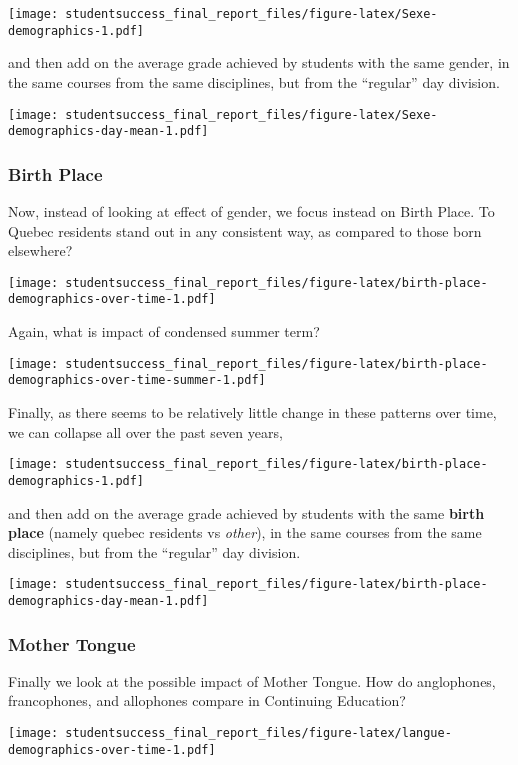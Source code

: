 \documentclass[]{book}
\theoremstyle{definition}
\theoremstyle{definition}
\theoremstyle{remark}
\begin{document}
\texttt{[image: studentsuccess\_final\_report\_files/figure-latex/Sexe-demographics-1.pdf]}

and then add on the average grade achieved by students with the same
gender, in the same courses from the same disciplines, but from the
``regular'' day division.

\texttt{[image: studentsuccess\_final\_report\_files/figure-latex/Sexe-demographics-day-mean-1.pdf]}

\subsubsection{Birth Place}\label{birth-place}

Now, instead of looking at effect of gender, we focus instead on Birth
Place. To Quebec residents stand out in any consistent way, as compared
to those born elsewhere?

\texttt{[image: studentsuccess\_final\_report\_files/figure-latex/birth-place-demographics-over-time-1.pdf]}

Again, what is impact of condensed summer term?

\texttt{[image: studentsuccess\_final\_report\_files/figure-latex/birth-place-demographics-over-time-summer-1.pdf]}

Finally, as there seems to be relatively little change in these patterns
over time, we can collapse all over the past seven years,

\texttt{[image: studentsuccess\_final\_report\_files/figure-latex/birth-place-demographics-1.pdf]}

and then add on the average grade achieved by students with the same
\textbf{birth place} (namely quebec residents vs \emph{other}), in the
same courses from the same disciplines, but from the ``regular'' day
division.

\texttt{[image: studentsuccess\_final\_report\_files/figure-latex/birth-place-demographics-day-mean-1.pdf]}

\subsubsection{Mother Tongue}\label{mother-tongue}

Finally we look at the possible impact of Mother Tongue. How do
anglophones, francophones, and allophones compare in Continuing
Education?

\texttt{[image: studentsuccess\_final\_report\_files/figure-latex/langue-demographics-over-time-1.pdf]}
\end{document}
